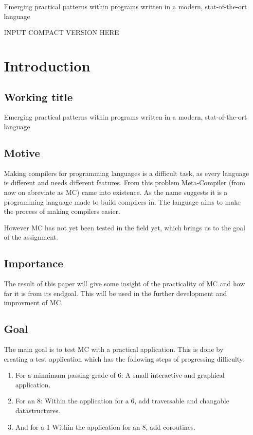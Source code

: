 

Emerging practical patterns within programs written in a modern, stat-of-the-ort language

INPUT COMPACT VERSION HERE



\chapter{Introduction}
\section{Working title}
Emerging practical patterns within programs written in a modern, stat-of-the-ort language
\section{Motive}
Making compilers for programming languages is a difficult task, as every language is different and needs different features.
From this problem Meta-Compiler (from now on abreviate as MC) came into existence.
As the name suggests it is a programming language made to build compilers in.
The language aims to make the process of making compilers easier.

However MC has not yet been tested in the field yet, which brings us to the goal of the assignment.

\section{Importance}
The result of this paper will give some insight of the practicality of MC and how far it is from its endgoal.
This will be used in the further development and improvment of MC.

\section{Goal}
The main goal is to test MC with a practical application.
This is done by creating a test application which has the following steps of progressing difficulty:
\begin{enumerate}
   \item For a minnimum passing grade of 6:
      A small interactive and graphical application.
   \item For an 8:
      Within the application for a 6, add traversable and changable datastructures.
   \item And for a 1
      Within the application for an 8, add coroutines.
\end{enumerate}

